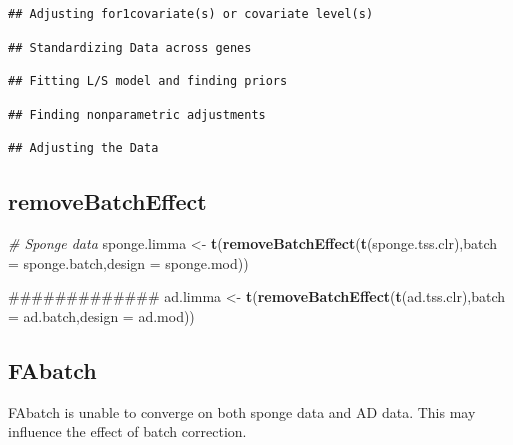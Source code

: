 \documentclass[]{book}
\newenvironment{Shaded}{\begin{snugshade}}{\end{snugshade}}
\newcommand{\KeywordTok}[1]{\textcolor[rgb]{0.13,0.29,0.53}{\textbf{#1}}}
\newcommand{\DataTypeTok}[1]{\textcolor[rgb]{0.13,0.29,0.53}{#1}}
\newcommand{\StringTok}[1]{\textcolor[rgb]{0.31,0.60,0.02}{#1}}
\newcommand{\CommentTok}[1]{\textcolor[rgb]{0.56,0.35,0.01}{\textit{#1}}}
\newcommand{\NormalTok}[1]{#1}
\begin{document}
\begin{verbatim}
## Adjusting for1covariate(s) or covariate level(s)
\end{verbatim}

\begin{verbatim}
## Standardizing Data across genes
\end{verbatim}

\begin{verbatim}
## Fitting L/S model and finding priors
\end{verbatim}

\begin{verbatim}
## Finding nonparametric adjustments
\end{verbatim}

\begin{verbatim}
## Adjusting the Data
\end{verbatim}

\subsection{removeBatchEffect}\label{removebatcheffect}

\begin{Shaded}
\begin{Highlighting}[]
\CommentTok{# Sponge data}
\NormalTok{sponge.limma <-}\StringTok{ }\KeywordTok{t}\NormalTok{(}\KeywordTok{removeBatchEffect}\NormalTok{(}\KeywordTok{t}\NormalTok{(sponge.tss.clr),}\DataTypeTok{batch =}\NormalTok{ sponge.batch,}\DataTypeTok{design =}\NormalTok{ sponge.mod))}

\NormalTok{#############}
\NormalTok{ad.limma <-}\StringTok{ }\KeywordTok{t}\NormalTok{(}\KeywordTok{removeBatchEffect}\NormalTok{(}\KeywordTok{t}\NormalTok{(ad.tss.clr),}\DataTypeTok{batch =}\NormalTok{ ad.batch,}\DataTypeTok{design =}\NormalTok{ ad.mod))}
\end{Highlighting}
\end{Shaded}

\subsection{FAbatch}\label{fabatch}

FAbatch is unable to converge on both sponge data and AD data. This may
influence the effect of batch correction.
\end{document}
